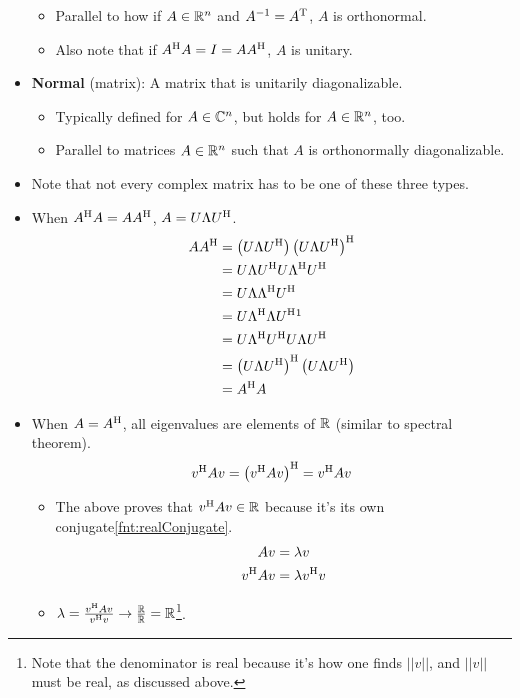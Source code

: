 \documentclass{article}
\begin{document}
\begin{itemize}
\begin{itemize}
        \item Parallel to how if $A\in\mathbb{R}^n$ and $A^{-1}=A^{\text{T}}$, $A$ is orthonormal.
        \item Also note that if $A^{\text{H}} A=I=AA^{\text{H}}$, $A$ is unitary.
    \end{itemize}
    \item \textbf{Normal} (matrix): A matrix that is unitarily diagonalizable.
    \begin{itemize}
        \item Typically defined for $A\in\mathbb{C}^n$, but holds for $A\in\mathbb{R}^n$, too.
        \item Parallel to matrices $A\in\mathbb{R}^n$ such that $A$ is orthonormally diagonalizable.
    \end{itemize}
    \item Note that not every complex matrix has to be one of these three types.
    \item When $A^{\text{H}} A=AA^{\text{H}}$, $A=U\Lambda U^{\text{H}}$.
    \begin{align*}
        AA^\He &= \left( U\Lambda U^\He \right)\left( U\Lambda U^\He \right)^\He\\
        &= U\Lambda U^\He U\Lambda^\He U^\He\\
        &= U\Lambda\Lambda^\He U^\He\\
        &= U\Lambda^\He\Lambda U^\He\footnotemark\\
        &= U\Lambda^\He U^\He U\Lambda U^\He\\
        &= \left( U\Lambda U^\He \right)^\He\left( U\Lambda U^\He \right)\\
        &= A^\He A
    \end{align*}
    \item When $A=A^{\text{H}}$, all eigenvalues are elements of $\mathbb{R}$ (similar to spectral theorem).
    \begin{equation*}
        v^{\text{H}} Av = \left( v^{\text{H}} Av \right)^{\text{H}} = v^{\text{H}} Av
    \end{equation*}
    \begin{itemize}
        \item The above proves that $v^{\text{H}} Av\in\mathbb{R}$ because it's its own conjugate\cref{fnt:realConjugate}.
        \begin{align*}
            Av &= \lambda v\\
            v^{\text{H}} Av &= \lambda v^{\text{H}} v
        \end{align*}
        \item $\lambda = \frac{v^{\text{H}} Av}{v^{\text{H}} v} \rightarrow \frac{\mathbb{R}}{\mathbb{R}} = \mathbb{R}$\footnote{Note that the denominator is real because it's how one finds $||v||$, and $||v||$ must be real, as discussed above.}.

\end{itemize}
\end{itemize}
\end{document}
